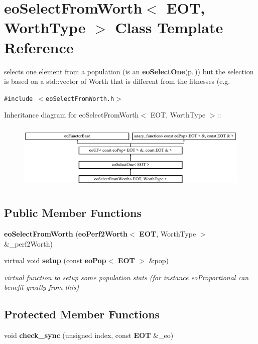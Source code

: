 \section{eo\-Select\-From\-Worth$<$ EOT, Worth\-Type $>$ Class Template Reference}
\label{classeo_select_from_worth}
selects one element from a population (is an {\bf eo\-Select\-One}{\rm (p.\,\pageref{classeo_select_one})}) but the selection is based on a std::vector of Worth that is different from the fitnesses (e.g.  


{\tt \#include $<$eo\-Select\-From\-Worth.h$>$}

Inheritance diagram for eo\-Select\-From\-Worth$<$ EOT, Worth\-Type $>$::\begin{figure}[H]
\begin{center}
\leavevmode
\includegraphics[height=3.23699cm]{classeo_select_from_worth}
\end{center}
\end{figure}
\subsection*{Public Member Functions}
\begin{CompactItemize}
\item 
{\bf eo\-Select\-From\-Worth} ({\bf eo\-Perf2Worth}$<$ {\bf EOT}, Worth\-Type $>$ \&\_\-perf2Worth)\label{classeo_select_from_worth_a0}

\item 
virtual void {\bf setup} (const {\bf eo\-Pop}$<$ {\bf EOT} $>$ \&pop)\label{classeo_select_from_worth_a1}

\begin{CompactList}\small\item\em virtual function to setup some population stats (for instance eo\-Proportional can benefit greatly from this) \item\end{CompactList}\end{CompactItemize}
\subsection*{Protected Member Functions}
\begin{CompactItemize}
\item 
void {\bf check\_\-sync} (unsigned index, const {\bf EOT} \&\_\-eo)\label{classeo_select_from_worth_b0}

\end{CompactItemize}

